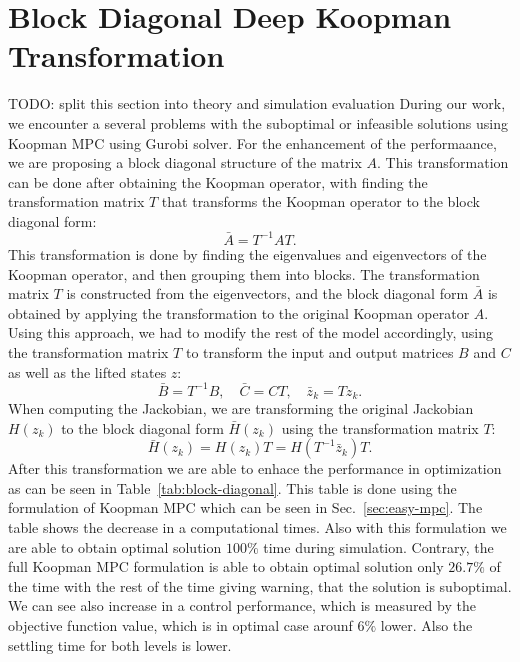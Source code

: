 \documentclass[preprint,12pt,authoryear]{elsarticle}
\newcommand{\todo}[1]{{{\color{red} TODO: #1	}} }
\begin{document}
\section{Block Diagonal Deep Koopman Transformation}
\todo{split this section into theory and simulation evaluation}
During our work, we encounter a several problems with the suboptimal or infeasible solutions using Koopman MPC using Gurobi solver. For the enhancement of the performaance, we are proposing a block diagonal structure of the matrix \(A\). This transformation can be done after obtaining the Koopman operator, with finding the transformation matrix \(T\) that transforms the Koopman operator to the block diagonal form:
\begin{equation}
  \bar{A} = T^{-1} A T.
\end{equation}
This transformation is done by finding the eigenvalues and eigenvectors of the Koopman operator, and then grouping them into blocks. The transformation matrix \(T\) is constructed from the eigenvectors, and the block diagonal form \(\bar{A}\) is obtained by applying the transformation to the original Koopman operator \(A\). Using this approach, we had to modify the rest of the model accordingly, using the transformation matrix \(T\) to transform the input and output matrices \(B\) and \(C\) as well as the lifted states \(z\):
\begin{equation}
  \bar{B} = T^{-1} B, \quad \bar{C} = C T, \quad \bar{z}_k = T z_k.
\end{equation}
When computing the Jackobian, we are transforming the original Jackobian \(H(z_k)\) to the block diagonal form \(\bar{H}(z_k)\) using the transformation matrix \(T\):
\begin{equation}
  \bar{H}(z_k) = H(z_k) T = H(T^{-1}\bar{z}_k) T.
\end{equation}
After this transformation we are able to enhace the performance in optimization as can be seen in Table~\ref{tab:block-diagonal}. This table is done using the formulation of Koopman MPC which can be seen in Sec.~\ref{sec:easy-mpc}. The table shows the decrease in a computational times. Also with this formulation we are able to obtain optimal solution \(100\%\) time during simulation. Contrary, the full Koopman MPC formulation is able to obtain optimal solution only \(26.7\%\) of the time with the rest of the time giving warning, that the solution is suboptimal. We can see also increase in a control performance, which is measured by the objective function value, which is in optimal case arounf \(6\%\) lower. Also the settling time for both levels is lower. 
\end{document}
